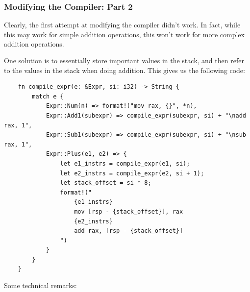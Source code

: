 \documentclass[letterpaper]{article}
\begin{document}
\subsubsection{Modifying the Compiler: Part 2}
Clearly, the first attempt at modifying the compiler didn't work. In fact, while this may work for simple addition operations, this won't work for more complex addition operations. 

\bigskip 

One solution is to essentially store important values in the stack, and then refer to the values in the stack when doing addition. This gives us the following code: 
\begin{verbatim}
    fn compile_expr(e: &Expr, si: i32) -> String {
        match e {
            Expr::Num(n) => format!("mov rax, {}", *n),
            Expr::Add1(subexpr) => compile_expr(subexpr, si) + "\nadd rax, 1",
            Expr::Sub1(subexpr) => compile_expr(subexpr, si) + "\nsub rax, 1",
            Expr::Plus(e1, e2) => {
                let e1_instrs = compile_expr(e1, si);
                let e2_instrs = compile_expr(e2, si + 1);
                let stack_offset = si * 8;
                format!("
                    {e1_instrs}
                    mov [rsp - {stack_offset}], rax
                    {e2_instrs}
                    add rax, [rsp - {stack_offset}]
                ")
            }
        }
    }\end{verbatim}
Some technical remarks: 
\end{document}
